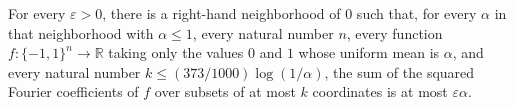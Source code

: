 \begin{theorem}
\label{FABL.exercise9_19_uniform_littleO}
\leanok
{}
For every $\varepsilon>0$, there is a right-hand neighborhood of $0$ such that, for
every $\alpha$ in that neighborhood with $\alpha\le1$, every natural number $n$, every
function $f:\{-1,1\}^n\to\mathbb R$ taking only the values $0$ and $1$ whose uniform
mean is $\alpha$, and every natural number $k\le(373/1000)\log(1/\alpha)$, the sum of
the squared Fourier coefficients of $f$ over subsets of at most $k$ coordinates is at
most $\varepsilon\alpha$.
\end{theorem}
